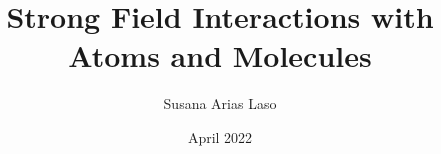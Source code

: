 \documentclass[final]{york-thesis}
\title{Strong Field Interactions with Atoms and Molecules}
\author{Susana Arias Laso}
\date{April 2022}
\begin{document}
\makefrontmatter
{}











\begin{appendices}

\end{appendices}
\end{document}
